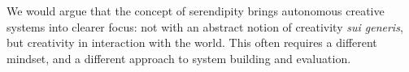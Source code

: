 We would argue that the concept of serendipity brings autonomous
creative systems into clearer focus: not with an abstract notion of
creativity \emph{sui generis}, but creativity in
interaction with the world.  This often requires a different mindset,
and a different approach to system building and evaluation.




